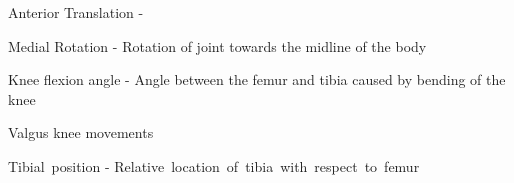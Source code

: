 Anterior Translation - 

Medial Rotation - Rotation of joint towards the midline of the body

Knee flexion angle - Angle between the femur and tibia caused by bending of the knee

Valgus knee movements

Tibial position - Relative location of tibia with respect to femur